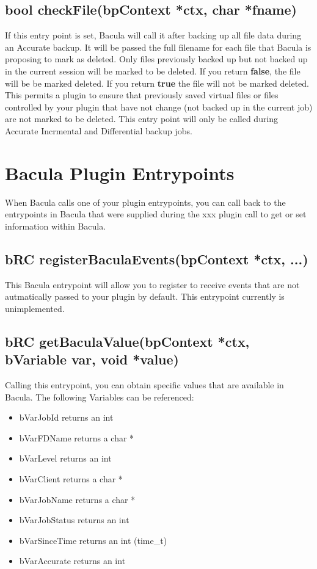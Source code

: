 \subsection{bool checkFile(bpContext *ctx, char *fname)}
If this entry point is set, Bacula will call it after backing up all file
data during an Accurate backup.  It will be passed the full filename for
each file that Bacula is proposing to mark as deleted.  Only files
previously backed up but not backed up in the current session will be
marked to be deleted.  If you return {\bf false}, the file will be be
marked deleted.  If you return {\bf true} the file will not be marked
deleted.  This permits a plugin to ensure that previously saved virtual
files or files controlled by your plugin that have not change (not backed
up in the current job) are not marked to be deleted.  This entry point will
only be called during Accurate Incrmental and Differential backup jobs.


\section{Bacula Plugin Entrypoints}
When Bacula calls one of your plugin entrypoints, you can call back to
the entrypoints in Bacula that were supplied during the xxx plugin call
to get or set information within Bacula.

\subsection{bRC registerBaculaEvents(bpContext *ctx, ...)}
This Bacula entrypoint will allow you to register to receive events
that are not autmatically passed to your plugin by default. This 
entrypoint currently is unimplemented.

\subsection{bRC getBaculaValue(bpContext *ctx, bVariable var, void *value)}
Calling this entrypoint, you can obtain specific values that are available
in Bacula. The following Variables can be referenced:
\begin{itemize}
\item bVarJobId returns an int
\item bVarFDName returns a char *
\item bVarLevel returns an int
\item bVarClient returns a char *
\item bVarJobName returns a char *
\item bVarJobStatus returns an int
\item bVarSinceTime returns an int (time\_t)
\item bVarAccurate returns an int
\end{itemize}


